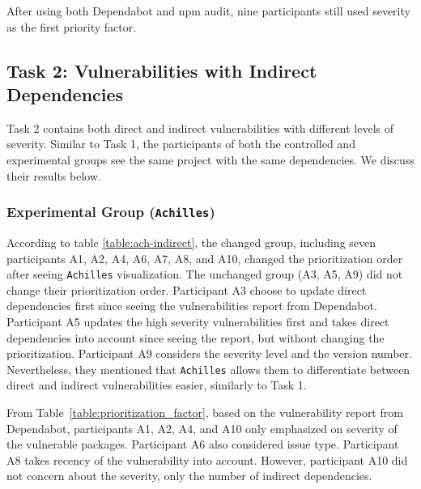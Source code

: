\documentclass[conference]{IEEEtran}
\begin{document}
	After using both Dependabot and npm audit, nine participants still used severity as the first priority factor.
	
	\subsection{Task 2: Vulnerabilities with Indirect Dependencies}
	Task 2 contains both direct and indirect vulnerabilities with different levels of severity. Similar to Task 1, the participants of both the controlled and experimental groups see the same project with the same dependencies. We discuss their results below.
	
	\subsubsection{Experimental Group (\texttt{Achilles})}
	According to table \ref{table:ach-indirect},
	the changed group, including seven participants A1, A2, A4, A6, A7, A8, and A10, changed the prioritization order after seeing \texttt{Achilles} visualization.  	
	The unchanged group (A3, A5, A9) did not change their prioritization order. Participant A3 choose to update direct dependencies first since seeing the vulnerabilities report from Dependabot. Participant A5 updates the high severity vulnerabilities first and takes direct dependencies into account since seeing the report, but without changing the prioritization. Participant A9 considers the severity level and the version number. Nevertheless, they mentioned that \texttt{Achilles} allows them to differentiate between direct and indirect vulnerabilities easier, similarly to Task 1.
	
	From Table~\ref{table:prioritization_factor}, based on the vulnerability report from Dependabot, participants A1, A2, A4, and A10 only emphasized on severity of the vulnerable packages. Participant A6 also considered issue type. Participant A8 takes recency of the vulnerability into account. However, participant A10 did not concern about the severity, only the number of indirect dependencies.
	
\end{document}
